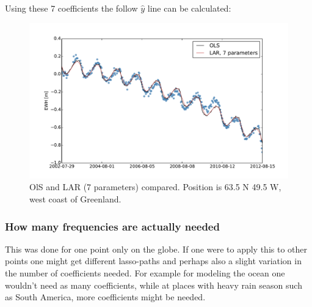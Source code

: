 Using these 7 coefficients the follow $\hat{y}$ line can be calculated:
\begin{figure}[H]
\center
\includegraphics[width=\textwidth]{figures/lar-compare}
\caption{OlS and LAR (7 parameters) compared. Position is 63.5 N 49.5 W, west coast of Greenland.}
\end{figure}

\subsubsection{How many frequencies are actually needed}

This was done for one point only on the globe. If one were to apply this to other points one might get different lasso-paths and perhaps also a slight variation in the number of coefficients needed. For example for modeling the ocean one wouldn't need as many coefficients, while at places with heavy rain season such as South America, more coefficients might be needed.
